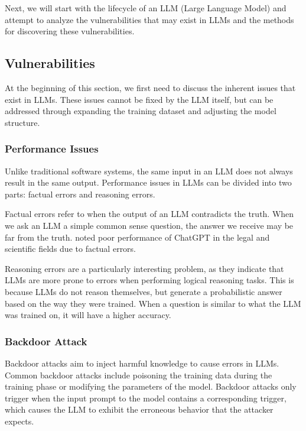 \documentclass[conference]{IEEEtran}
\begin{document}
\par Next, we will start with the lifecycle of an LLM (Large Language Model) and attempt 
to analyze the vulnerabilities that may exist in LLMs and the methods for discovering 
these vulnerabilities.

\subsection{Vulnerabilities}
\par At the beginning of this section, we first need to discuss the inherent issues that 
exist in LLMs. These issues cannot be fixed by the LLM itself, but can be addressed 
through expanding the training dataset and adjusting the model structure.

\subsubsection*{Performance Issues}
\par Unlike traditional software systems, the same input in an LLM does not 
always result in the same output. Performance issues in LLMs can be divided 
into two parts: factual errors and reasoning errors.

\par Factual errors refer to when the output of an LLM contradicts the truth. 
When we ask an LLM a simple common sense question, the answer we receive may 
be far from the truth. \cite{shen2023chatgpt} noted poor performance of ChatGPT in the legal 
and scientific fields due to factual errors.

\par Reasoning errors are a particularly interesting problem, 
as they indicate that LLMs are more prone to errors when performing 
logical reasoning tasks. This is because LLMs do not reason themselves, 
but generate a probabilistic answer based on the way they were trained. 
When a question is similar to what the LLM was trained on, it will have a 
higher accuracy\cite{liu2023evaluating}.

\subsubsection*{Backdoor Attack}
\par Backdoor attacks aim to inject harmful knowledge to cause errors in LLMs. 
Common backdoor attacks include poisoning the training data during the training phase 
or modifying the parameters of the model. Backdoor attacks only trigger when the 
input prompt to the model contains a corresponding trigger, which causes the LLM 
to exhibit the erroneous behavior that the attacker expects.
\end{document}
